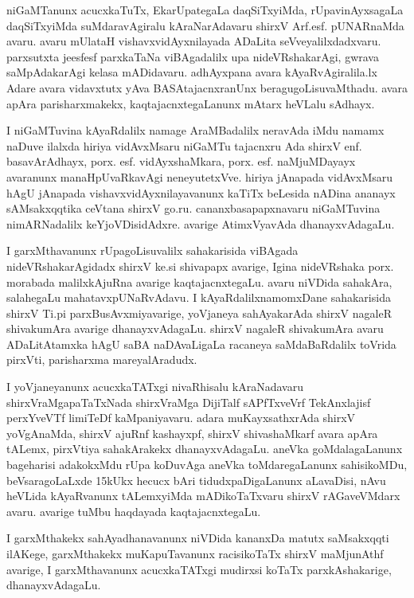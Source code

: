 niGaMTanunx acucxkaTuTx, EkarUpategaLa daqSiTxyiMda, rUpavinAyxsagaLa daqSiTxyiMda suMdaravAgiralu kAraNarAdavaru shirxV Arf.esf. pUNARnaMda avaru. avaru mUlataH vishavxvidAyxnilayada ADaLita seVveyalilxdadxvaru. parxsutxta jeesfesf parxkaTaNa viBAgadalilx upa nideVRshakarAgi, gwrava saMpAdakarAgi kelasa mADidavaru. adhAyxpana avara kAyaRvAgiralila.lx Adare avara vidavxtutx yAva BASAtajacnxranUnx beragugoLisuvaMthadu. avara apAra parisharxmakekx, kaqtajacnxtegaLanunx mAtarx heVLalu sAdhayx.

I niGaMTuvina kAyaRdalilx namage AraMBadalilx neravAda iMdu namamx naDuve ilalxda hiriya vidAvxMsaru niGaMTu tajacnxru Ada shirxV enf. basavArAdhayx, porx. esf. vidAyxshaMkara, porx. esf. naMjuMDayayx avaranunx manaHpUvaRkavAgi neneyutetxVve. hiriya jAnapada vidAvxMsaru hAgU jAnapada vishavxvidAyxnilayavanunx kaTiTx beLesida nADina ananayx sAMsakxqqtika ceVtana shirxV go.ru. cananxbasapapxnavaru niGaMTuvina nimARNadalilx keYjoVDisidAdxre. avarige AtimxVyavAda dhanayxvAdagaLu. 

I garxMthavanunx rUpagoLisuvalilx sahakarisida viBAgada nideVRshakarAgidadx shirxV ke.si shivapapx avarige, Igina nideVRshaka porx. morabada malilxkAjuRna avarige kaqtajacnxtegaLu. avaru niVDida sahakAra, salahegaLu mahatavxpUNaRvAdavu. I kAyaRdalilx\break namomxDane sahakarisida shirxV Ti.pi parxBusAvxmiyavarige, yoVjaneya sahAyakarAda shirxV nagaleR shivakumAra avarige dhanayxvAdagaLu. shirxV nagaleR shivakumAra avaru ADaLitAtamxka hAgU saBA naDAvaLigaLa racaneya saMdaBaRdalilx toVrida pirxVti, parisharxma mareyalAradudx. 

I yoVjaneyanunx acucxkaTATxgi nivaRhisalu kAraNadavaru shirxVraMgapaTaTxNada shirxVraMga DijiTalf sAPfTxveVrf TekAnxlajisf perxYveVTf limiTeDf kaMpaniyavaru. adara muKayxsathxrAda shirxV yoVgAnaMda, shirxV ajuRnf kashayxpf, shirxV shivashaMkarf avara apAra tALemx, pirxVtiya sahakArakekx dhanayxvAdagaLu. aneVka goMdalagaLanunx bageharisi adakokxMdu rUpa koDuvAga aneVka toMdaregaLanunx sahisikoMDu, beVsaragoLaLxde 15kUkx hecucx bAri tidudxpaDigaLanunx aLavaDisi, nAvu heVLida kAyaRvanunx tALemxyiMda mADi\-koTaTxvaru shirxV rAGaveVMdarx avaru. avarige tuMbu haqdayada kaqtajacnxtegaLu. 

I garxMthakekx sahAyadhanavanunx niVDida kananxDa matutx saMsakxqqti ilAKege, garxMthakekx muKapuTavanunx racisikoTaTx shirxV maMjunAthf avarige, I garxMthavanunx acucxkaTATxgi mudirxsi koTaTx \underline{\qquad\qquad\qquad\qquad} parxkAshakarige, dhanayxvAdagaLu. 

\newpage

